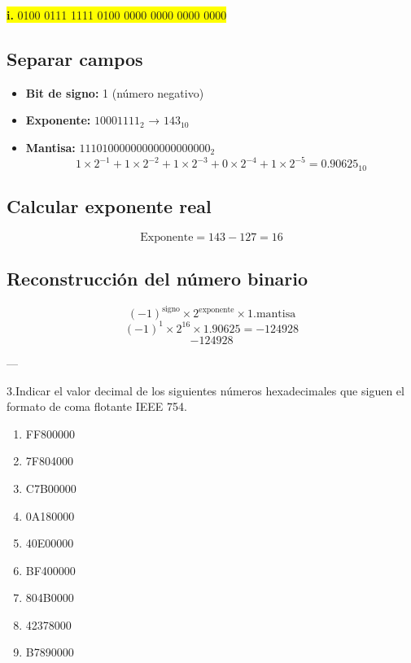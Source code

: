 \documentclass[a4paper,12pt]{article}
\begin{document}
	\begin{center}
		\colorbox{yellow}{\textbf{i.} 0100 0111 1111 0100 0000 0000 0000 0000}
		
		\subsection*{Separar campos}
		
		\begin{itemize}
			\item \textbf{Bit de signo:} 1 (número negativo)
			\item \textbf{Exponente:} $10001111_2$ → $143_{10}$
			\item \textbf{Mantisa:} $11101000000000000000000_2$ 
			\[
			1\times2^{-1} + 1\times2^{-2} + 1\times2^{-3} + 0\times2^{-4} + 1\times2^{-5} = 0.90625_{10}
			\]
		\end{itemize}
		
		\subsection*{Calcular exponente real}
		
		\[
		\text{Exponente} = 143 - 127 = 16
		\]
		
		
		
		\subsection*{Reconstrucción del número binario}	
		\[
		(-1)^{\text{signo}} \times 2^{\text{exponente}} \times 1.\text{mantisa}
		\]
		\[
		(-1)^1 \times 2^16 \times 1.90625 = -124928
		\]
		\vspace{1em}
		\[
		\boxed{-124928}
		\]
		
		---
	\end{center}
	
	3.Indicar el valor decimal de los siguientes números hexadecimales que siguen
	el formato de coma flotante IEEE 754.
	\begin{enumerate}
		\item FF800000
		\item 7F804000
		\item C7B00000
		\item 0A180000
		\item 40E00000
		\item BF400000
		\item 804B0000
		\item 42378000
		\item B7890000
	\end{enumerate}	
\end{document}
